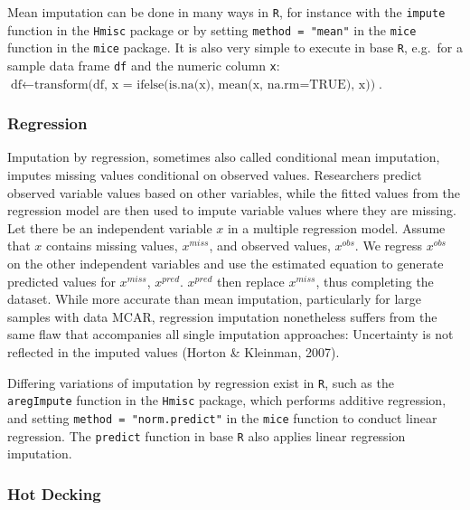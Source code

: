 \documentclass[12pt,econ]{sources/authesis}
\begin{document}
Mean imputation can be done in many ways in \texttt{R}, for instance with the \texttt{impute} function in the \texttt{Hmisc} package or by setting \texttt{method\ =\ "mean"} in the \texttt{mice} function in the \texttt{mice} package. It is also very simple to execute in base \texttt{R}, e.g.~for a sample data frame \texttt{df} and the numeric column \texttt{x}: \(\text{df} \leftarrow \text{transform(df, x = ifelse(is.na(x), mean(x, na.rm=TRUE), x))}\).

\hypertarget{ordmiss-theory-impute-regress}{%
\subsubsection{Regression}\label{ordmiss-theory-impute-regress}}

Imputation by regression, sometimes also called conditional mean imputation, imputes missing values conditional on observed values. Researchers predict observed variable values based on other variables, while the fitted values from the regression model are then used to impute variable values where they are missing. Let there be an independent variable \(x\) in a multiple regression model. Assume that \(x\) contains missing values, \(x^{miss}\), and observed values, \(x^{obs}\). We regress \(x^{obs}\) on the other independent variables and use the estimated equation to generate predicted values for \(x^{miss}\), \(x^{pred}\). \(x^{pred}\) then replace \(x^{miss}\), thus completing the dataset. While more accurate than mean imputation, particularly for large samples with data MCAR, regression imputation nonetheless suffers from the same flaw that accompanies all single imputation approaches: Uncertainty is not reflected in the imputed values (Horton \& Kleinman, 2007).

Differing variations of imputation by regression exist in \texttt{R}, such as the \texttt{aregImpute} function in the \texttt{Hmisc} package, which performs additive regression, and setting \texttt{method\ =\ "norm.predict"} in the \texttt{mice} function to conduct linear regression. The \texttt{predict} function in base \texttt{R} also applies linear regression imputation.

\hypertarget{ordmiss-theory-impute-hd}{%
\subsubsection{Hot Decking}\label{ordmiss-theory-impute-hd}}
\end{document}
